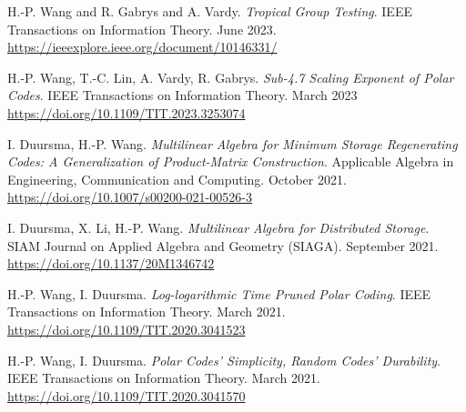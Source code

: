 \documentclass{article}
\def\sec#1{\vskip1em\textbf{\fs1#1}}
\def\fs#1{%
        \pgfmathsetmacro\a{#1}%
        \pgfmathsetmacro\A{\parskip*(4/3)^\a}%
        \pgfmathsetmacro\B{\A*(4/3)}%
        \fontsize{\A pt}{\B pt}\selectfont%
    }
\begin{document}
\bgroup
\def\section#1#2{\sec{Journal Publications \mdseries (new to old)}}
\begin{thebibliography}{J9}
    H.-P. Wang and R. Gabrys and A. Vardy.
    \emph{Tropical Group Testing}.
    IEEE Transactions on Information Theory.
    June 2023.
    \url{https://ieeexplore.ieee.org/document/10146331/}

    H.-P. Wang, T.-C. Lin, A. Vardy, R. Gabrys.
    \emph{Sub-4.7 Scaling Exponent of Polar Codes}.
    IEEE Transactions on Information Theory.
    March 2023
    \url{https://doi.org/10.1109/TIT.2023.3253074}

    I. Duursma, H.-P. Wang.
    \emph{Multilinear Algebra for Minimum Storage Regenerating Codes:
        A Generalization of Product-Matrix Construction}.
    Applicable Algebra in Engineering, Communication and Computing.
    October 2021.
    \url{https://doi.org/10.1007/s00200-021-00526-3}

    I. Duursma, X. Li, H.-P. Wang.
    \emph{Multilinear Algebra for Distributed Storage}.
    SIAM Journal on Applied Algebra and Geometry (SIAGA).
    September 2021.
    \url{https://doi.org/10.1137/20M1346742}

    H.-P. Wang, I. Duursma.
    \emph{Log-logarithmic Time Pruned Polar Coding}.
    IEEE Transactions on Information Theory.
    March 2021.
    \url{https://doi.org/10.1109/TIT.2020.3041523}

    H.-P. Wang, I. Duursma.
    \emph{Polar Codes' Simplicity, Random Codes' Durability}.
    IEEE Transactions on Information Theory.
    March 2021.
    \url{https://doi.org/10.1109/TIT.2020.3041570}
\end{thebibliography}
\egroup
\end{document}
